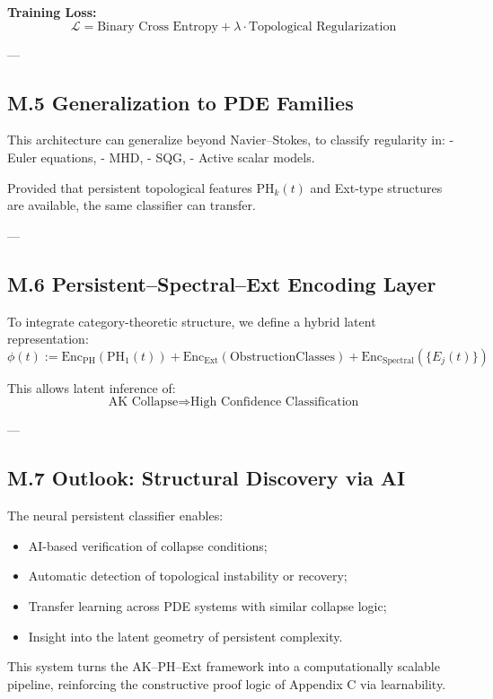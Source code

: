 \documentclass[11pt]{article}
\theoremstyle{definition}
\begin{document}
\textbf{Training Loss:}
\[
\mathcal{L} = \text{Binary Cross Entropy} + \lambda \cdot \text{Topological Regularization}
\]

---

\subsection*{M.5 Generalization to PDE Families}

This architecture can generalize beyond Navier–Stokes, to classify regularity in:
- Euler equations,
- MHD,
- SQG,
- Active scalar models.

Provided that persistent topological features \( \mathrm{PH}_k(t) \) and Ext-type structures are available, the same classifier can transfer.

---

\subsection*{M.6 Persistent–Spectral–Ext Encoding Layer}

To integrate category-theoretic structure, we define a hybrid latent representation:
\[
\phi(t) := \mathrm{Enc}_{\mathrm{PH}}(\mathrm{PH}_1(t)) + \mathrm{Enc}_{\mathrm{Ext}}(\mathrm{Obstruction Classes}) + \mathrm{Enc}_{\text{Spectral}}(\{E_j(t)\})
\]

This allows latent inference of:
\[
\text{AK Collapse} \Rightarrow \text{High Confidence Classification}
\]

---

\subsection*{M.7 Outlook: Structural Discovery via AI}

The neural persistent classifier enables:
\begin{itemize}
  \item AI-based verification of collapse conditions;
  \item Automatic detection of topological instability or recovery;
  \item Transfer learning across PDE systems with similar collapse logic;
  \item Insight into the latent geometry of persistent complexity.
\end{itemize}

This system turns the AK–PH–Ext framework into a computationally scalable pipeline, reinforcing the constructive proof logic of Appendix C via learnability.
\end{document}
